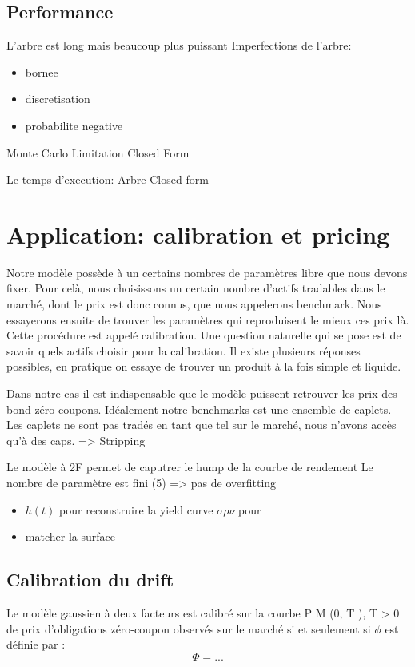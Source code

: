 \documentclass[paper=a4, fontsize=11pt]{scrartcl}
\numberwithin{equation}{section}		%
\numberwithin{figure}{section}			%
\numberwithin{table}{section}				%
\theoremstyle{definition}
\begin{document}
\subsection{Performance}
L'arbre est long mais beaucoup plus puissant
Imperfections de l'arbre:
\begin{itemize}
\item  bornee
\item  discretisation
\item  probabilite negative
\end{itemize}
Monte Carlo
Limitation
Closed Form

Le temps d'execution:
Arbre
Closed form

\newpage

\section{Application: calibration et pricing}
Notre modèle possède à un certains nombres de paramètres libre que nous devons fixer. Pour celà, nous choisissons un certain nombre d'actifs tradables dans le marché, dont le prix est donc connus, que nous appelerons benchmark. Nous essayerons ensuite de trouver les paramètres qui reproduisent le mieux ces prix là. Cette procédure est appelé calibration.
Une question naturelle qui se pose est de savoir quels actifs choisir pour la calibration. Il existe plusieurs réponses possibles, en pratique on essaye de trouver un produit à la fois simple et liquide.

Dans notre cas il est indispensable que le modèle puissent retrouver les prix des bond zéro coupons.
Idéalement notre benchmarks est une ensemble de caplets. Les caplets ne sont pas tradés en tant que tel sur le marché, nous n'avons accès qu'à des caps. => Stripping

Le modèle à 2F permet de caputrer le hump de la courbe de rendement
Le nombre de paramètre est fini (5) => pas de overfitting


\begin{itemize}
\item $h(t)$ pour reconstruire la yield curve $\sigma \rho \nu$ pour
\item  matcher la surface
\end{itemize}

\subsection{Calibration du drift}
Le modèle gaussien à deux facteurs est calibré sur la
courbe P M (0, T ), T > 0 de prix d’obligations zéro-coupon observés sur le
marché si et seulement si $\phi$ est définie par :
$$\Phi = ...$$
\end{document}
